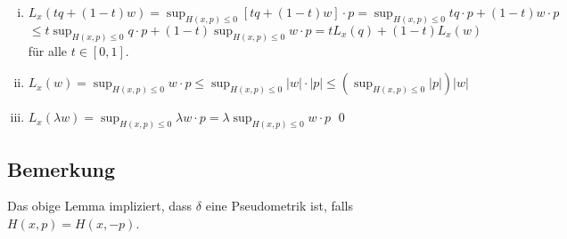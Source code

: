 	\begin{enumerate}[(i)]
		\item $L_x(tq+(1-t)w) = \sup_{H(x,p) \leq 0} [tq + (1-t)w] \cdot p = \sup_{H(x,p) \leq 0} tq \cdot p + (1-t)w \cdot p$ \\
		$\leq t \sup_{H(x,p) \leq 0} q \cdot p + (1-t) \sup_{H(x,p) \leq 0} w \cdot p = tL_x(q) + (1-t)L_x(w)$ für alle $t \in [0,1]$.
		\item $L_x(w) = \sup_{H(x,p) \leq 0} w \cdot p \leq \sup_{H(x,p) \leq 0} |w| \cdot |p| \leq (\sup_{H(x,p) \leq 0} |p|) |w|$
		\item $L_x(\lambda w) = \sup_{H(x,p) \leq 0} \lambda w \cdot p = \lambda \sup_{H(x,p) \leq 0} w \cdot p$ \qed
	\end{enumerate}
	
\subsection{Bemerkung}
\label{bem_32}
	Das obige Lemma impliziert, dass $\delta$ eine Pseudometrik ist, falls $H(x,p) = H(x,-p)$. \marginnote{[32]}
	
